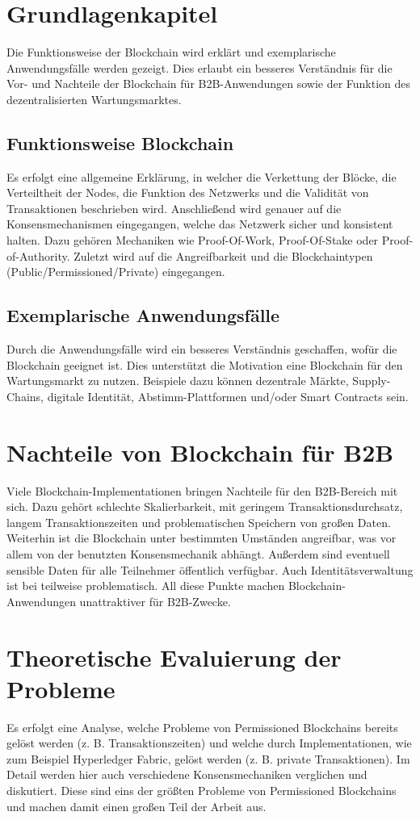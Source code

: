 \documentclass{llncs}
\begin{document}
\section{Grundlagenkapitel}
Die Funktionsweise der Blockchain wird erklärt und exemplarische Anwendungsfälle werden gezeigt. Dies erlaubt ein besseres Verständnis für die Vor- und Nachteile der Blockchain für B2B-Anwendungen sowie der Funktion des dezentralisierten Wartungsmarktes.

\subsection{Funktionsweise Blockchain}
Es erfolgt eine allgemeine Erklärung, in welcher die Verkettung der Blöcke, die Verteiltheit der Nodes, die Funktion des Netzwerks und die Validität von Transaktionen beschrieben wird. Anschließend wird genauer auf die Konsensmechanismen eingegangen, welche das Netzwerk sicher und konsistent halten. Dazu gehören Mechaniken wie Proof-Of-Work, Proof-Of-Stake oder Proof-of-Authority. Zuletzt wird auf die Angreifbarkeit und die Blockchaintypen (Public/Permissioned/Private) eingegangen.

\subsection{Exemplarische Anwendungsfälle}
Durch die Anwendungsfälle wird ein besseres Verständnis geschaffen, wofür die Blockchain geeignet ist. Dies unterstützt die Motivation eine Blockchain für den Wartungsmarkt zu nutzen. Beispiele dazu können dezentrale Märkte, Supply-Chains, digitale Identität, Abstimm-Plattformen und/oder Smart Contracts sein.

\section{Nachteile von Blockchain für B2B}
Viele Blockchain-Implementationen bringen Nachteile für den B2B-Bereich mit sich. Dazu gehört schlechte Skalierbarkeit, mit geringem Transaktionsdurchsatz, langem Transaktionszeiten und problematischen Speichern von großen Daten. Weiterhin ist die Blockchain unter bestimmten Umständen angreifbar, was vor allem von der benutzten Konsensmechanik abhängt. Außerdem sind eventuell sensible Daten für alle Teilnehmer öffentlich verfügbar. Auch Identitätsverwaltung ist bei teilweise problematisch. All diese Punkte machen Blockchain-Anwendungen unattraktiver für B2B-Zwecke.

\section{Theoretische Evaluierung der Probleme}
Es erfolgt eine Analyse, welche Probleme von Permissioned Blockchains bereits gelöst werden (z. B. Transaktionszeiten) und welche durch Implementationen, wie zum Beispiel Hyperledger Fabric, gelöst werden (z. B. private Transaktionen). Im Detail werden hier auch verschiedene Konsensmechaniken verglichen und diskutiert. Diese sind eins der größten Probleme von Permissioned Blockchains und machen damit einen großen Teil der Arbeit aus.
\end{document}
